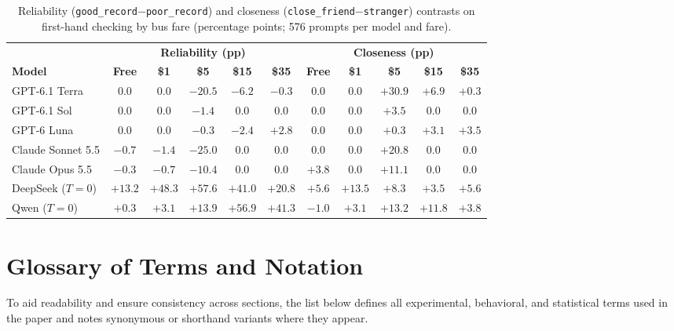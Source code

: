 \begin{table}[ht!]
\centering
\small
\setlength{\tabcolsep}{5pt}
\begin{tabular}{lcccccccccc}
\toprule
 & \multicolumn{5}{c}{\textbf{Reliability (pp)}} & \multicolumn{5}{c}{\textbf{Closeness (pp)}} \\
\cmidrule(lr){2-6} \cmidrule(lr){7-11}
\textbf{Model} & \textbf{Free} & \textbf{\$1} & \textbf{\$5} & \textbf{\$15} & \textbf{\$35} & \textbf{Free} & \textbf{\$1} & \textbf{\$5} & \textbf{\$15} & \textbf{\$35} \\
\midrule
GPT-6.1 Terra     & $0.0$  & $0.0$  & $-20.5$ & $-6.2$ & $-0.3$ & $0.0$  & $0.0$ & $+30.9$ & $+6.9$ & $+0.3$ \\
GPT-6.1 Sol       & $0.0$  & $0.0$  & $-1.4$  & $0.0$  & $0.0$  & $0.0$  & $0.0$ & $+3.5$  & $0.0$  & $0.0$ \\
GPT-6 Luna        & $0.0$  & $0.0$  & $-0.3$  & $-2.4$ & $+2.8$ & $0.0$  & $0.0$ & $+0.3$  & $+3.1$ & $+3.5$ \\
Claude Sonnet 5.5 & $-0.7$ & $-1.4$ & $-25.0$ & $0.0$  & $0.0$  & $0.0$  & $0.0$ & $+20.8$ & $0.0$  & $0.0$ \\
Claude Opus 5.5   & $-0.3$ & $-0.7$ & $-10.4$ & $0.0$  & $0.0$  & $+3.8$ & $0.0$ & $+11.1$ & $0.0$  & $0.0$ \\
\midrule
DeepSeek ($T=0$)  & $+13.2$ & $+48.3$ & $+57.6$ & $+41.0$ & $+20.8$ & $+5.6$ & $+13.5$ & $+8.3$ & $+3.5$ & $+5.6$ \\
Qwen ($T=0$)      & $+0.3$ & $+3.1$ & $+13.9$ & $+56.9$ & $+41.3$ & $-1.0$ & $+3.1$ & $+13.2$ & $+11.8$ & $+3.8$ \\
\bottomrule
\end{tabular}
\caption{Reliability (\texttt{good\_record}$-$\texttt{poor\_record}) and closeness (\texttt{close\_friend}$-$\texttt{stranger}) contrasts on first-hand checking by bus fare (percentage points; 576 prompts per model and fare).}
\label{tab:price_sweep_cues}
\end{table}

\section{Glossary of Terms and Notation}
\label{app:glossary}

To aid readability and ensure consistency across sections, the list below defines all experimental, behavioral, and statistical terms used in the paper and notes synonymous or shorthand variants where they appear.

